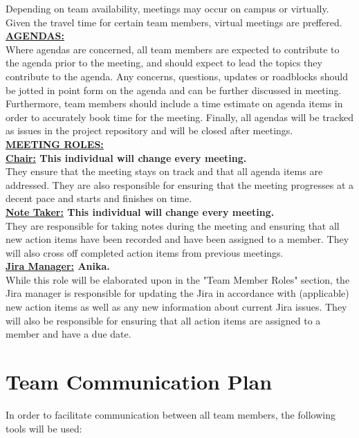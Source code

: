 \documentclass{article}
\begin{document}
Depending on team availability, meetings may occur on campus or virtually. 
Given the travel time for certain team members, virtual meetings are preffered.\\

\noindent \textbf{\underline{AGENDAS:}} \\

Where agendas are concerned, all team members are expected to contribute to the agenda prior to the meeting, and should expect to lead the topics they contribute to the agenda. 
Any concerns, questions, updates or roadblocks should be jotted in point form on the agenda and can be further discussed in meeting. 
Furthermore, team members should include a time estimate on agenda items in order to accurately book time for the meeting.
Finally, all agendas will be tracked as issues in the project repository and will be closed after meetings. \\

\noindent \textbf{\underline{MEETING ROLES:}} \\

\noindent \textbf{\underline{Chair:} This individual will change every meeting. } \\
\noindent They ensure that the meeting stays on track and that all agenda items are addressed. 
They are also responsible for ensuring that the meeting progresses at a decent pace and starts and finishes on time. \\

\noindent \textbf{\underline{Note Taker:} This individual will change every meeting.} \\
\noindent They are responsible for taking notes during the meeting and ensuring that all new action items have been recorded and have been assigned to a member.
They will also cross off completed action items from previous meetings.\\

\noindent \textbf{\underline{Jira Manager:} Anika.} \\
\noindent While this role will be elaborated upon in the "Team Member Roles" section, the Jira manager is responsible for updating the Jira in accordance with (applicable) new action items as well as any new information about current Jira issues.
They will also be responsible for ensuring that all action items are assigned to a member and have a due date.\\



\section{Team Communication Plan}
In order to facilitate communication between all team members, the following tools will be used:
\end{document}
